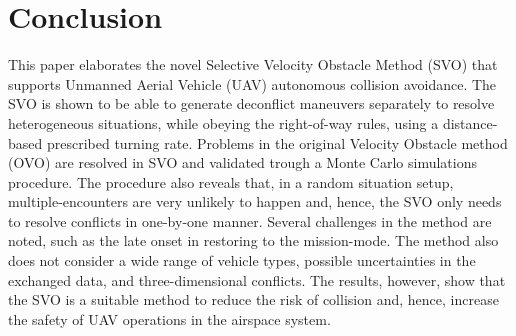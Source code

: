 \section{Conclusion}
This paper elaborates the novel Selective Velocity Obstacle Method (SVO) that supports Unmanned Aerial Vehicle (UAV) autonomous collision avoidance. The SVO is shown to be able to generate deconflict maneuvers separately to resolve heterogeneous situations, while obeying the right-of-way rules, using a distance-based prescribed turning rate. Problems in the original Velocity Obstacle method (OVO) are resolved in SVO and validated trough a Monte Carlo simulations procedure. The procedure also reveals that, in a random situation setup, multiple-encounters are very unlikely to happen and, hence, the SVO only needs to resolve conflicts in one-by-one manner. Several challenges in the method are noted, such as the late onset in restoring to the mission-mode. The method also does not consider a wide range of vehicle types, possible uncertainties in the exchanged data, and three-dimensional conflicts. The results, however, show that the SVO is a suitable method to reduce the risk of collision and, hence, increase the safety of UAV operations in the airspace system.
